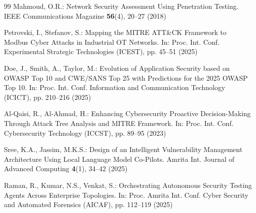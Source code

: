 \documentclass[journal]{IEEEtran}
\begin{document}
\begin{thebibliography}{99}
Mahmoud, O.R.: Network Security Assessment Using Penetration Testing. IEEE Communications Magazine \textbf{56}(4), 20--27 (2018)

Petrovski, I., Stefanov, S.: Mapping the MITRE ATT\&CK Framework to Modbus Cyber Attacks in Industrial OT Networks. In: Proc. Int. Conf. Experimental Strategic Technologies (ICEST), pp. 45--51 (2025)

Doe, J., Smith, A., Taylor, M.: Evolution of Application Security based on OWASP Top 10 and CWE/SANS Top 25 with Predictions for the 2025 OWASP Top 10. In: Proc. Int. Conf. Information and Communication Technology (ICICT), pp. 210--216 (2025)

Al-Qaisi, R., Al-Ahmad, H.: Enhancing Cybersecurity Proactive Decision-Making Through Attack Tree Analysis and MITRE Framework. In: Proc. Int. Conf. Cybersecurity Technology (ICCST), pp. 89--95 (2023)

Sree, K.A., Jassim, M.K.S.: Design of an Intelligent Vulnerability Management Architecture Using Local Language Model Co-Pilots. Amrita Int. Journal of Advanced Computing \textbf{4}(1), 34--42 (2025)

Raman, R., Kumar, N.S., Venkat, S.: Orchestrating Autonomous Security Testing Agents Across Enterprise Topologies. In: Proc. Amrita Int. Conf. Cyber Security and Automated Forensics (AICAF), pp. 112--119 (2025)

\end{thebibliography}
\end{document}
